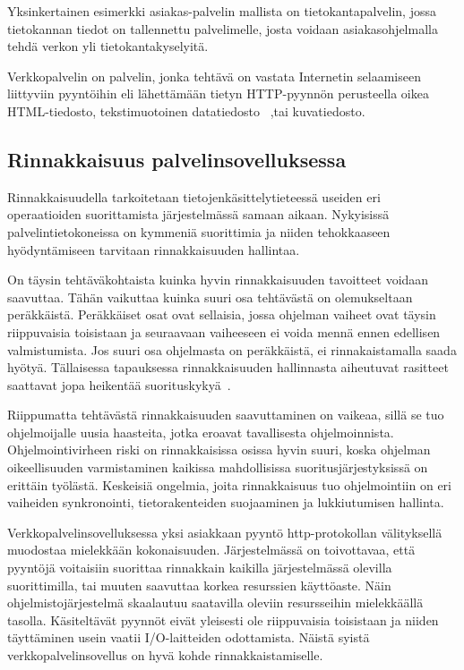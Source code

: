 \documentclass[12pt]{article}
\begin{document}
Yksinkertainen esimerkki asiakas-palvelin mallista on tietokantapalvelin,
jossa tietokannan tiedot on tallennettu palvelimelle, josta voidaan
asiakasohjelmalla tehdä verkon yli tietokantakyselyitä.

Verkkopalvelin on palvelin, jonka tehtävä on vastata Internetin
selaamiseen liittyviin pyyntöihin eli lähettämään tietyn HTTP-pyynnön
perusteella oikea HTML-tiedosto, tekstimuotoinen datatiedosto~\cite{Berners-Lee_1994}
,tai kuvatiedosto.
\subsection{Rinnakkaisuus palvelinsovelluksessa}

Rinnakkaisuudella tarkoitetaan tietojenkäsittelytieteessä useiden
eri operaatioiden suorittamista järjestelmässä samaan aikaan.
Nykyisissä palvelintietokoneissa on kymmeniä suorittimia ja niiden tehokkaaseen
hyödyntämiseen tarvitaan rinnakkaisuuden hallintaa.

On täysin tehtäväkohtaista
kuinka hyvin rinnakkaisuuden tavoitteet voidaan saavuttaa.
Tähän vaikuttaa kuinka suuri osa tehtävästä on olemukseltaan peräkkäistä.
Peräkkäiset osat ovat sellaisia, jossa ohjelman vaiheet ovat täysin
riippuvaisia toisistaan ja seuraavaan vaiheeseen ei voida mennä ennen edellisen
valmistumista. Jos suuri osa ohjelmasta on peräkkäistä, ei rinnakaistamalla
saada hyötyä. Tällaisessa tapauksessa rinnakkaisuuden hallinnasta aiheutuvat
rasitteet saattavat jopa heikentää suorituskykyä~\cite{stallings_operating_2018}.

Riippumatta tehtävästä rinnakkaisuuden saavuttaminen on vaikeaa,
sillä se tuo ohjelmoijalle uusia haasteita, jotka eroavat tavallisesta
ohjelmoinnista. Ohjelmointivirheen riski on rinnakkaisissa osissa hyvin suuri,
koska ohjelman oikeellisuuden varmistaminen kaikissa mahdollisissa
suoritusjärjestyksissä on erittäin työlästä.
Keskeisiä ongelmia, joita rinnakkaisuus tuo ohjelmointiin on eri vaiheiden
synkronointi, tietorakenteiden suojaaminen ja lukkiutumisen hallinta.

Verkkopalvelinsovelluksessa yksi asiakkaan pyyntö http-protokollan välityksellä
muodostaa mielekkään kokonaisuuden.
Järjestelmässä on toivottavaa, että pyyntöjä voitaisiin suorittaa
rinnakkain kaikilla järjestelmässä olevilla suorittimilla, tai muuten 
saavuttaa korkea resurssien käyttöaste.
Näin ohjelmistojärjestelmä skaalautuu saatavilla oleviin resursseihin
mielekkäällä tasolla. Käsiteltävät pyynnöt eivät yleisesti ole riippuvaisia
toisistaan ja niiden täyttäminen usein vaatii I/O-laitteiden odottamista.
Näistä syistä verkkopalvelinsovellus on hyvä kohde rinnakkaistamiselle.
\end{document}
